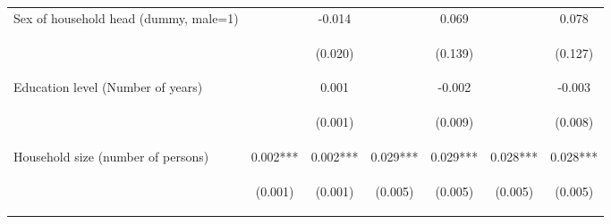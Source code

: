 \begin{center}
\begin{tabular}{lcccccc}
Sex of household head (dummy, male=1) &  & -0.014 &  & 0.069 &  & 0.078 \\
\vspace{4pt} & \begin{footnotesize}\end{footnotesize} & \begin{footnotesize}(0.020)\end{footnotesize} & \begin{footnotesize}\end{footnotesize} & \begin{footnotesize}(0.139)\end{footnotesize} & \begin{footnotesize}\end{footnotesize} & \begin{footnotesize}(0.127)\end{footnotesize} \\
Education level (Number of years) &  & 0.001 &  & -0.002 &  & -0.003 \\
\vspace{4pt} & \begin{footnotesize}\end{footnotesize} & \begin{footnotesize}(0.001)\end{footnotesize} & \begin{footnotesize}\end{footnotesize} & \begin{footnotesize}(0.009)\end{footnotesize} & \begin{footnotesize}\end{footnotesize} & \begin{footnotesize}(0.008)\end{footnotesize} \\
Household size (number of persons) & 0.002*** & 0.002*** & 0.029*** & 0.029*** & 0.028*** & 0.028*** \\
\vspace{4pt} & \begin{footnotesize}(0.001)\end{footnotesize} & \begin{footnotesize}(0.001)\end{footnotesize} & \begin{footnotesize}(0.005)\end{footnotesize} & \begin{footnotesize}(0.005)\end{footnotesize} & \begin{footnotesize}(0.005)\end{footnotesize} & \begin{footnotesize}(0.005)\end{footnotesize} \\

\end{tabular}
\end{center}
